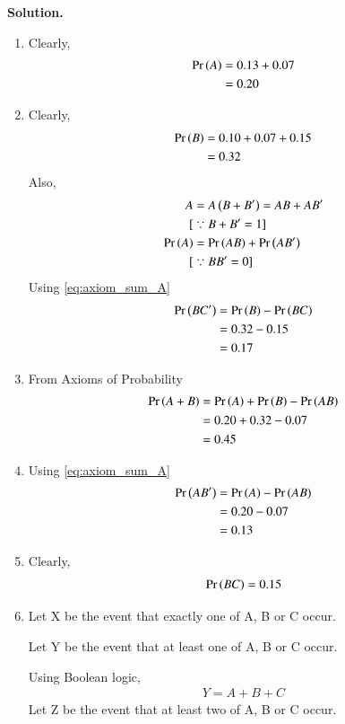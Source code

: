 \documentclass[journal,12pt,twocolumn]{IEEEtran}
\begin{document}
\textbf{Solution.}
\begin{enumerate}[label=(\alph*)]
\item 
Clearly,
\begin{align}
\Pr\left(A\right) &= 0.13 + 0.07\\
       &= 0.20
\end{align}
\item 
Clearly,
\begin{align}
\label{eq:1}
    \Pr\left(B\right) &= 0.10 + 0.07 + 0.15\\
       &= 0.32
\end{align}
Also,
\begin{align}
A &= A \left(B+B^{\prime}\right) =  AB + AB^{\prime}\\
[&\because B + B^\prime = 1]\\\label{eq:axiom_sum_A}
\Pr\left(A\right) &= \Pr\left(AB\right) +\Pr\left(AB^\prime\right)\\
    [&\because BB^\prime = 0] \nonumber
\end{align}
Using \eqref{eq:axiom_sum_A}
\begin{align}
    \Pr\left(BC^\prime\right) &= \Pr\left(B\right) - \Pr\left(BC\right) \\
    &= 0.32 - 0.15\\
    &= 0.17
\end{align}
\item 
From Axioms of Probability
\begin{align}
\label{Axioms}
    \Pr\left(A + B\right) &= \Pr\left(A\right) + \Pr\left(B\right) - \Pr\left(AB\right)\\
    &= 0.20 + 0.32 - 0.07\\
    &= 0.45
\end{align}
\item 
Using \eqref{eq:axiom_sum_A}
\begin{align}
    \Pr\left(AB^\prime\right) &= \Pr\left(A\right) - \Pr\left(AB\right) \\
    &= 0.20 - 0.07\\
    &= 0.13
\end{align}
\item 
Clearly,
\begin{align}
    \Pr\left(BC\right) = 0.15
\end{align}
\item 
Let X be the event that exactly one of A, B or C occur.

Let Y be the event that at least one of A, B or C occur.

Using Boolean logic,
\begin{align}
    Y=A+B+C
\end{align}
Let Z be the event that at least two of A, B or C occur.


\end{enumerate}
\end{document}
